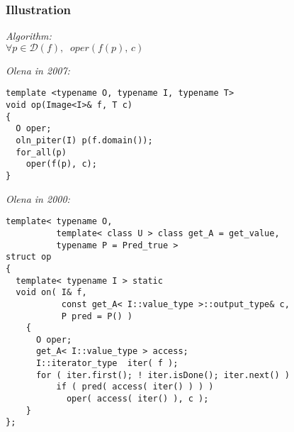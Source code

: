 \documentclass{beamer}
\begin{document}
\begin{frame}[fragile]
  \frametitle{Illustration}


\begin{minipage}{0.5\linewidth}
{\it Algorithm:}\\
\smallskip
{\tiny
$\forall p \in \mathcal{D}(f), \;\; \mathit{oper}(f(p), \, c)$
}

\bigskip\medskip

{\it Olena in 2007:}
\smallskip
\begin{lstlisting}[basicstyle={\tiny\sffamily}]
template <typename O, typename I, typename T>
void op(Image<I>& f, T c)
{
  O oper;
  oln_piter(I) p(f.domain());
  for_all(p)
    oper(f(p), c);
}

\end{lstlisting}

\end{minipage}
  \hspace*{2mm}
\begin{minipage}{.45\linewidth}

{\it Olena in 2000:}
\smallskip
\begin{lstlisting}[basicstyle={\tiny\sffamily}]
template< typename O,
          template< class U > class get_A = get_value,
          typename P = Pred_true >
struct op
{
  template< typename I > static
  void on( I& f,
           const get_A< I::value_type >::output_type& c,
           P pred = P() )
    {
      O oper;
      get_A< I::value_type > access;
      I::iterator_type  iter( f );
      for ( iter.first(); ! iter.isDone(); iter.next() )
          if ( pred( access( iter() ) ) )
            oper( access( iter() ), c );
    }
};
\end{lstlisting}
  
\end{minipage}

\end{frame}



\end{document}
